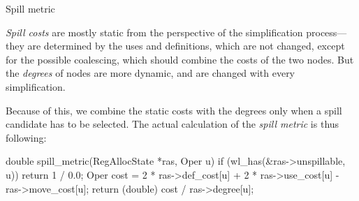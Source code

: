 %

\seccc Spill metric

{\em Spill costs} are mostly static from the perspective of the simplification
process---they are determined by the uses and definitions, which are not
changed, except for the possible coalescing, which should combine the costs
of the two nodes. But the {\em degrees} of nodes are more
dynamic, and are changed with every simplification.

Because of this, we combine the static costs with the degrees only when a spill
candidate has to be selected. The actual calculation of the {\em spill metric}
is thus following:

\begtt
double spill_metric(RegAllocState *ras, Oper u) {
	if (wl_has(&ras->unspillable, u)) {
		return 1 / 0.0;
	}
	Oper cost = 2 * ras->def_cost[u] + 2 * ras->use_cost[u] - ras->move_cost[u];
	return (double) cost / ras->degree[u];
}
\endtt


